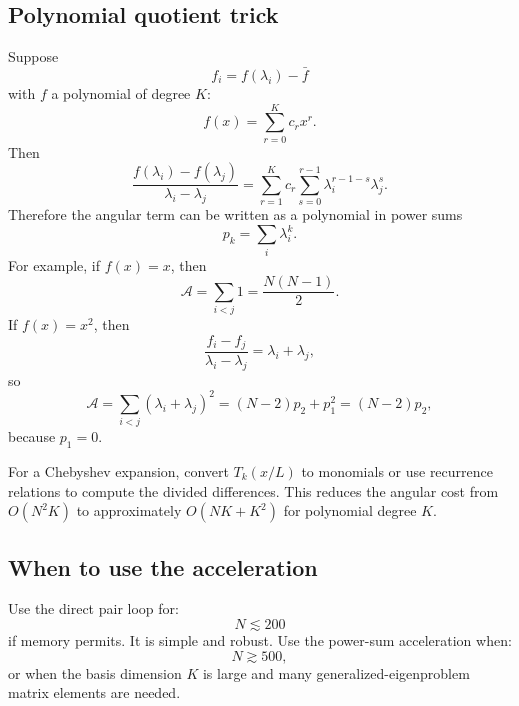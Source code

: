 \documentclass[11pt]{article}
\newcommand{\calA}{\mathcal A}
\begin{document}
\subsection{Polynomial quotient trick}

Suppose
\begin{equation}
f_i=f(\lambda_i)-\bar f
\end{equation}
with $f$ a polynomial of degree $K$:
\begin{equation}
f(x)=\sum_{r=0}^Kc_rx^r.
\end{equation}
Then
\begin{equation}
\frac{f(\lambda_i)-f(\lambda_j)}{\lambda_i-\lambda_j}
=\sum_{r=1}^Kc_r\sum_{s=0}^{r-1}\lambda_i^{r-1-s}\lambda_j^s.
\end{equation}
Therefore the angular term can be written as a polynomial in power sums
\begin{equation}
p_k=\sum_i\lambda_i^k.
\end{equation}
For example, if $f(x)=x$, then
\begin{equation}
\calA=\sum_{i<j}1=\frac{N(N-1)}2.
\end{equation}
If $f(x)=x^2$, then
\begin{equation}
\frac{f_i-f_j}{\lambda_i-\lambda_j}=\lambda_i+\lambda_j,
\end{equation}
so
\begin{equation}
\calA=\sum_{i<j}(\lambda_i+\lambda_j)^2
=(N-2)p_2+p_1^2=(N-2)p_2,
\end{equation}
because $p_1=0$.

For a Chebyshev expansion, convert $T_k(x/L)$ to monomials or use recurrence relations to compute the divided differences.  This reduces the angular cost from $O(N^2K)$ to approximately $O(NK+K^2)$ for polynomial degree $K$.

\subsection{When to use the acceleration}

Use the direct pair loop for:
\begin{equation}
N\lesssim 200
\end{equation}
if memory permits.  It is simple and robust.  Use the power-sum acceleration when:
\begin{equation}
N\gtrsim 500,
\end{equation}
or when the basis dimension $K$ is large and many generalized-eigenproblem matrix elements are needed.
\end{document}
